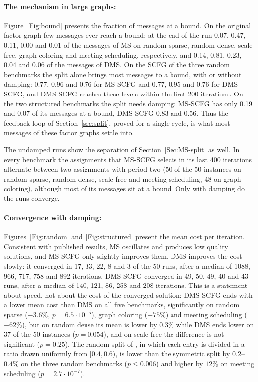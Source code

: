 \paragraph{The mechanism in large graphs:}
Figure~\ref{Fig:bound} presents the fraction of messages at a bound. On the original factor graph few messages ever reach a bound: at the end of the run 0.07, 0.47, 0.11, 0.00 and 0.01 of the messages of MS on random sparse, random dense, scale free, graph coloring and meeting scheduling, respectively, and 0.14, 0.81, 0.23, 0.04 and 0.06 of the messages of DMS. On the SCFG of the three random benchmarks the split alone brings most messages to a bound, with or without damping: 0.77, 0.96 and 0.76 for MS-SCFG and 0.77, 0.95 and 0.76 for DMS-SCFG, and DMS-SCFG reaches these levels within the first 200 iterations. On the two structured benchmarks the split needs damping: MS-SCFG has only 0.19 and 0.07 of its messages at a bound, DMS-SCFG 0.83 and 0.56. Thus the feedback loop of Section~\ref{sec:split}, proved for a single cycle, is what most messages of these factor graphs settle into.

The undamped runs show the separation of Section~\ref{Sec:MS-split} as well. In every benchmark the assignments that MS-SCFG selects in its last 400 iterations alternate between two assignments with period two (50 of the 50 instances on random sparse, random dense, scale free and meeting scheduling, 48 on graph coloring), although most of its messages sit at a bound. Only with damping do the runs converge.

\paragraph{Convergence with damping:}
Figures~\ref{Fig:random} and~\ref{Fig:structured} present the mean cost per iteration. Consistent with published results, MS oscillates and produces low quality solutions, and MS-SCFG only slightly improves them. DMS improves the cost slowly: it converged in 17, 33, 22, 8 and 3 of the 50 runs, after a median of 1088, 966, 717, 758 and 892 iterations. DMS-SCFG converged in 49, 50, 49, 40 and 43 runs, after a median of 140, 121, 86, 258 and 208 iterations. This is a statement about speed, not about the cost of the converged solution: DMS-SCFG ends with a lower mean cost than DMS on all five benchmarks, significantly on random sparse ($-3.6\%$, $p = 6.5\cdot 10^{-5}$), graph coloring ($-75\%$) and meeting scheduling ($-62\%$), but on random dense its mean is lower by $0.3\%$ while DMS ends lower on 37 of the 50 instances ($p = 0.054$), and on scale free the difference is not significant ($p = 0.25$). The random split of \citet{CohenGZ20}, in which each entry is divided in a ratio drawn uniformly from $[0.4, 0.6)$, is lower than the symmetric split by $0.2$--$0.4\%$ on the three random benchmarks ($p \le 0.006$) and higher by $12\%$ on meeting scheduling ($p = 2.7\cdot 10^{-7}$).

